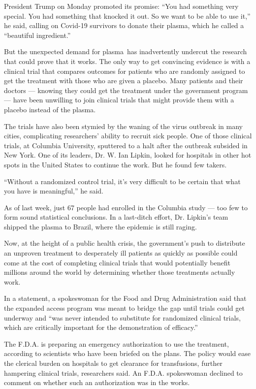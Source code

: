 President Trump on Monday promoted its promise: ``You had something very
special. You had something that knocked it out. So we want to be able to
use it,'' he said, calling on Covid-19 survivors to donate their plasma,
which he called a ``beautiful ingredient.''

But the unexpected demand for plasma~has inadvertently undercut the
research that could prove that it works. The only way to get convincing
evidence is with a clinical trial that compares outcomes for patients
who are randomly assigned to get the treatment with those who are given
a placebo. Many patients and their doctors --- knowing they could get
the treatment under the government program --- have been unwilling to
join clinical trials that might provide them with a placebo instead of
the plasma.

The trials have also been stymied by the waning of the virus outbreak in
many cities, complicating researchers' ability to recruit sick people.
One of those clinical trials, at Columbia University, sputtered to a
halt after the outbreak subsided in New York. One of its leaders, Dr. W.
Ian Lipkin, looked for hospitals in other hot spots in the United States
to continue the work. But he found few takers.

``Without a randomized control trial, it's very difficult to be certain
that what you have is meaningful,'' he said.

As of last week, just 67 people had enrolled in the Columbia study ---
too few to form sound statistical conclusions. In a last-ditch effort,
Dr. Lipkin's team shipped the plasma to Brazil, where the epidemic is
still raging.

Now, at the height of a public health crisis, the government's push to
distribute an unproven treatment to desperately ill patients as quickly
as possible could come at the cost of completing clinical trials that
would potentially benefit millions around the world by determining
whether those treatments actually work.

In a statement, a spokeswoman for the Food and Drug Administration said
that the expanded access program was meant to bridge the gap until
trials could get underway and ``was never intended to substitute for
randomized clinical trials, which are critically important for the
demonstration of efficacy.''

The F.D.A. is preparing an emergency authorization to use the treatment,
according to scientists who have been briefed on the plans. The policy
would ease the clerical burden on hospitals to get clearance for
transfusions, further hampering clinical trials, researchers said. An
F.D.A. spokeswoman declined to comment on whether such an authorization
was in the works.

